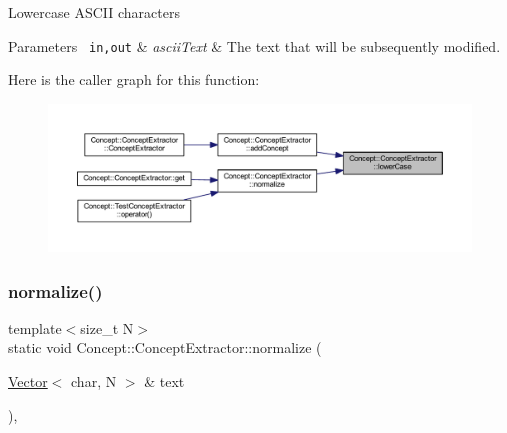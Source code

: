 Lowercase A\+S\+C\+II characters 
\begin{DoxyParams}[1]{Parameters}
\mbox{\texttt{ in,out}}  & {\em ascii\+Text} & The text that will be subsequently modified. \\
\hline
\end{DoxyParams}
Here is the caller graph for this function\+:\nopagebreak
\begin{figure}[H]
\begin{center}
\leavevmode
\includegraphics[width=350pt]{class_concept_1_1_concept_extractor_a975f600a76c667d317fbde638ebb0c48_icgraph}
\end{center}
\end{figure}
\mbox{\label{class_concept_1_1_concept_extractor_a48c47fd5c4eaa6b6bfd5edd127d5d492}} 
\subsubsection{\texorpdfstring{normalize()}{normalize()}}
{\footnotesize\ttfamily template$<$size\+\_\+t N$>$ \\
static void Concept\+::\+Concept\+Extractor\+::normalize (\begin{DoxyParamCaption}\item[{\mbox{\hyperlink{class_concept_1_1_vector}{Vector}}$<$ char, N $>$ \&}]{text }\end{DoxyParamCaption})\hspace{0.3cm}{\ttfamily [inline]}, {\ttfamily [static]}}

